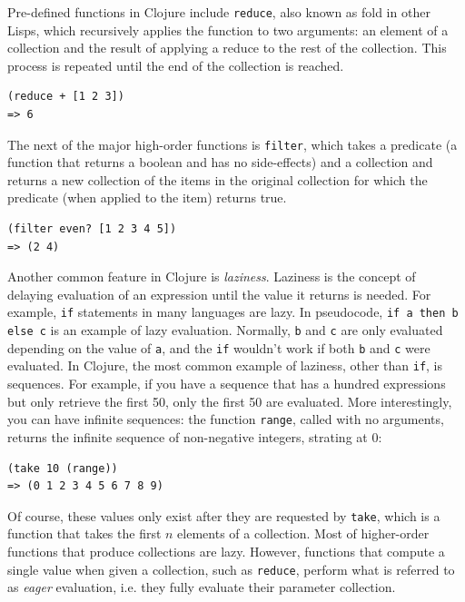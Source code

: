 \documentclass[12pt]{article}
\newcommand{\comment}[1]{{\bf \tt  {#1}}}
\newcommand{\emcomment}[1]{\textcolor{ForestGreen}{\comment{Elena: {#1}}}}
\newcommand{\clocode}[1]{{\texttt {#1}}}
\begin{document}
Pre-defined functions in Clojure include \clocode{reduce}, also known as fold in other Lisps, which recursively applies the function to two arguments: an element of a collection and the result of applying a reduce to the rest of the collection. This process is repeated until the end of the collection is reached. 
\begin{verbatim}
(reduce + [1 2 3])
=> 6
\end{verbatim}
The next of the major high-order functions is \clocode{filter}, which takes a predicate (a function that returns a boolean and has no side-effects) and a collection and returns a new collection of the items in the original collection for which the predicate (when applied to the item) returns true.
\begin{verbatim}
(filter even? [1 2 3 4 5])
=> (2 4)
\end{verbatim}
Another common feature in Clojure is {\it  laziness}. Laziness is the concept of delaying evaluation of an expression until the value it returns is needed. For example, \clocode{if} statements in many languages are lazy. In pseudocode, \clocode{if a then b else c} is an example of lazy evaluation. Normally, \clocode{b} and \clocode{c} are only evaluated depending on the value of \clocode{a}, and the \clocode{if} wouldn't work if both \clocode{b} and \clocode{c} were evaluated. 
In Clojure, the most common example of laziness, other than \clocode{if}, is sequences. For example, if you have a sequence that has a hundred expressions but only retrieve the first 50, only the first 50 are evaluated. More interestingly, you can have infinite sequences: the function \clocode{range}, called with no arguments, returns the infinite sequence of non-negative integers, strating at 0:
\begin{verbatim}
(take 10 (range))
=> (0 1 2 3 4 5 6 7 8 9)
\end{verbatim}
Of course, these values only exist after they are requested by \clocode{take}, which is a function that takes the first $n$ elements of a collection. 
Most of higher-order functions that produce collections are lazy. However, functions that compute a single value when given a collection, such as \clocode{reduce}, perform what is referred to as {\it  eager} evaluation, i.e. they fully evaluate their parameter collection. 
\end{document}
